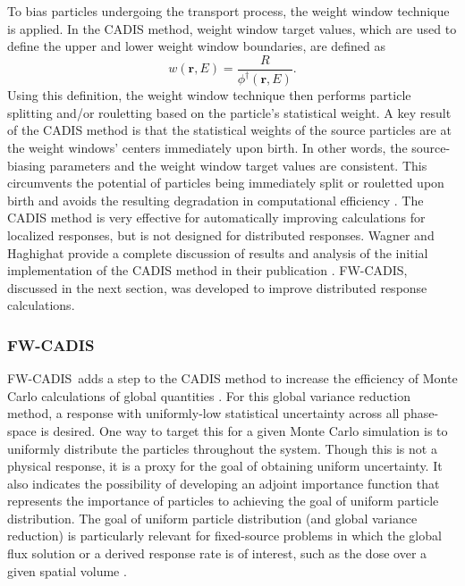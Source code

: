 \documentclass{article} %
\newcommand{\vecr}{\textbf{r}}
\newcommand{\fwc}{\mbox{FW-CADIS}}
\begin{document}
To bias particles undergoing the transport process, the weight window
technique is applied. In the CADIS method, weight window target values, which
are used to define the upper and lower weight window boundaries, are defined
as
%
\begin{equation}
w(\vecr,E) 
= \frac{R}{\phi^{\dagger}(\vecr,E)}.
\label{eq:cadis_tb}
\end{equation}
%
Using this definition, the weight window technique then performs particle
splitting and/or rouletting based on the particle's statistical weight. A key
result of the CADIS method is that the statistical weights of the source
particles are at the weight windows' centers immediately upon birth. In other
words, the source-biasing parameters and the weight window target values are
consistent. This circumvents the potential of particles being immediately
split or rouletted upon birth and avoids the resulting degradation in
computational efficiency \cite{cadis}. The CADIS method is very effective for
automatically improving calculations for localized responses, but is not
designed for distributed responses. Wagner and Haghighat provide a complete
discussion of results and analysis of the initial implementation of the CADIS
method in their publication \cite{cadis}. \fwc, discussed in the next section,
was developed to improve distributed response calculations.

\subsubsection{\fwc}

\fwc\ adds a step to the CADIS method to increase the efficiency of Monte
Carlo calculations of global quantities \cite{fwcadis}. For this global
variance reduction method, a response with uniformly-low statistical
uncertainty across all phase-space is desired. One way to target this for a
given Monte Carlo simulation is to uniformly distribute the particles
throughout the system. Though this is not a physical response, it is a proxy
for the goal of obtaining uniform uncertainty. It also indicates the
possibility of developing an adjoint importance function that represents the
importance of particles to achieving the goal of uniform particle
distribution. The goal of uniform particle distribution (and global variance
reduction) is particularly relevant for fixed-source problems in which the
global flux solution or a derived response rate is of interest, such as the
dose over a given spatial volume \cite{wilsonslaybaugh}.
\end{document}
